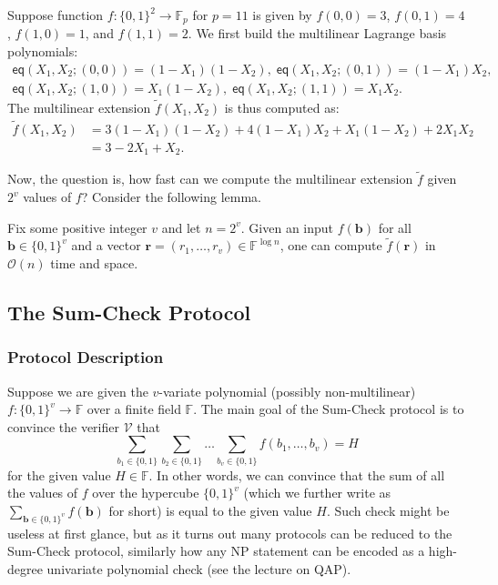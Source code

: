 \documentclass[../../book.tex]{subfiles}
\begin{document}
\begin{example}\label{example:mle}
    Suppose function $f: \{0,1\}^2 \to \mathbb{F}_p$ for $p=11$ is given by
    $f(0,0)=3$, $f(0,1)=4$, $f(1,0)=1$, and $f(1,1)=2$. We first build the
    multilinear Lagrange basis polynomials:
    \vspace{-7.5px}
    \begin{gather*}
        \mathsf{eq}(X_1,X_2;(0,0)) = (1-X_1)(1-X_2), \;
        \mathsf{eq}(X_1,X_2;(0,1)) = (1-X_1)X_2, \\
        \mathsf{eq}(X_1,X_2;(1,0)) = X_1(1-X_2), \;
        \mathsf{eq}(X_1,X_2;(1,1)) = X_1X_2.
    \end{gather*}
    The multilinear extension $\widetilde{f}(X_1,X_2)$ is thus computed as:
    \vspace{-7.5px}
    \begin{align*}
        \widetilde{f}(X_1,X_2) &= 3(1-X_1)(1-X_2) + 4(1-X_1)X_2 + X_1(1-X_2) + 2X_1X_2 \\
        &= 3 - 2X_1 + X_2.
    \end{align*}
\end{example}

Now, the question is, how fast can we compute the multilinear extension
$\widetilde{f}$ given $2^v$ values of $f$? Consider the following lemma.

\begin{lemma}\label{lemma:multilinear-extension-computation}
    Fix some positive integer $v$ and let $n=2^v$. Given an input
    $f(\boldsymbol{b})$ for all $\boldsymbol{b} \in \{0,1\}^v$ and a vector
    $\boldsymbol{r}=(r_1,\dots,r_v) \in \mathbb{F}^{\log n}$, one can compute
    $\widetilde{f}(\mathbf{r})$ in $\mathcal{O}(n)$ time and space.
\end{lemma}

\subsection{The Sum-Check Protocol}

\subsubsection{Protocol Description}

Suppose we are given the $v$-variate polynomial (possibly non-multilinear) $f:
\{0,1\}^v \to \mathbb{F}$ over a finite field $\mathbb{F}$. The main goal
of the Sum-Check protocol \cite{sumcheck} is to convince the verifier $\mathcal{V}$ that
\begin{equation*}
    \sum_{b_1 \in \{0,1\}}\sum_{b_2 \in \{0,1\}} \dots \sum_{b_v \in \{0,1\}} f(b_1,\dots,b_v) = H
\end{equation*}
for the given value $H \in \mathbb{F}$. In other words, we can convince that the
sum of all the values of $f$ over the hypercube $\{0,1\}^v$ (which we further
write as $\sum_{\boldsymbol{b} \in \{0,1\}^v}f(\boldsymbol{b})$ for short) is
equal to the given value $H$. Such check might be useless at first glance, but
as it turns out many protocols can be reduced to the Sum-Check protocol,
similarly how any NP statement can be encoded as a high-degree univariate
polynomial check (see the lecture on QAP).
\end{document}
